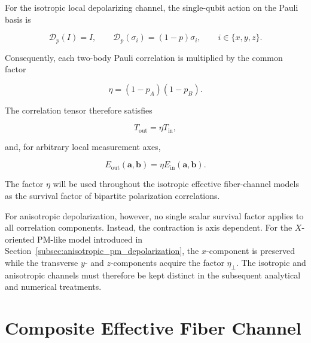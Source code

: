 For the isotropic local depolarizing channel, the single-qubit action on the Pauli
basis is

\begin{equation}
\mathcal{D}_p(I)=I,
\qquad
\mathcal{D}_p(\sigma_i)
=
(1-p)\sigma_i,
\qquad
i\in\{x,y,z\}.
\label{eq:depolarizing_pauli_action}
\end{equation}

Consequently, each two-body Pauli correlation is multiplied by the common factor

\begin{equation}
\eta
=
(1-p_A)(1-p_B).
\label{eq:correlation_survival_factor}
\end{equation}

The correlation tensor therefore satisfies

\begin{equation}
T_{\mathrm{out}}
=
\eta T_{\mathrm{in}},
\label{eq:local_depolarizing_tensor_contraction}
\end{equation}

and, for arbitrary local measurement axes,

\begin{equation}
E_{\mathrm{out}}(\mathbf{a},\mathbf{b})
=
\eta
E_{\mathrm{in}}(\mathbf{a},\mathbf{b}).
\label{eq:local_depolarizing_correlation_contraction}
\end{equation}

The factor \( \eta \) will be used throughout the isotropic effective fiber-channel
models as the survival factor of bipartite polarization correlations.

For anisotropic depolarization, however, no single scalar survival factor applies
to all correlation components. Instead, the contraction is axis dependent. For
the \(X\)-oriented PM-like model introduced in
Section~\ref{subsec:anisotropic_pm_depolarization}, the \(x\)-component is
preserved while the transverse \(y\)- and \(z\)-components acquire the factor
\(\eta_{\perp}\). The isotropic and anisotropic channels must therefore be kept
distinct in the subsequent analytical and numerical treatments.


\section{Composite Effective Fiber Channel}
\label{sec:composite_effective_fiber_channel}

